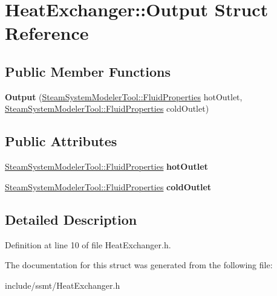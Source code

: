 \hypertarget{struct_heat_exchanger_1_1_output}{}\section{Heat\+Exchanger\+:\+:Output Struct Reference}
\label{struct_heat_exchanger_1_1_output}
\subsection*{Public Member Functions}
\begin{DoxyCompactItemize}
\item 
\mbox{\label{struct_heat_exchanger_1_1_output_aeb73d441f9a6f13839ec02d7f6d1f30f}} 
{\bfseries Output} (\hyperlink{struct_steam_system_modeler_tool_1_1_fluid_properties}{Steam\+System\+Modeler\+Tool\+::\+Fluid\+Properties} hot\+Outlet, \hyperlink{struct_steam_system_modeler_tool_1_1_fluid_properties}{Steam\+System\+Modeler\+Tool\+::\+Fluid\+Properties} cold\+Outlet)
\end{DoxyCompactItemize}
\subsection*{Public Attributes}
\begin{DoxyCompactItemize}
\item 
\mbox{\label{struct_heat_exchanger_1_1_output_a6b4e7a81d54aa209a1507818e654c3c6}} 
\hyperlink{struct_steam_system_modeler_tool_1_1_fluid_properties}{Steam\+System\+Modeler\+Tool\+::\+Fluid\+Properties} {\bfseries hot\+Outlet}
\item 
\mbox{\label{struct_heat_exchanger_1_1_output_a0c0bed7c2c3d99ee8c49d6c19f7789e8}} 
\hyperlink{struct_steam_system_modeler_tool_1_1_fluid_properties}{Steam\+System\+Modeler\+Tool\+::\+Fluid\+Properties} {\bfseries cold\+Outlet}
\end{DoxyCompactItemize}


\subsection{Detailed Description}


Definition at line 10 of file Heat\+Exchanger.\+h.



The documentation for this struct was generated from the following file\+:\begin{DoxyCompactItemize}
\item 
include/ssmt/Heat\+Exchanger.\+h\end{DoxyCompactItemize}
